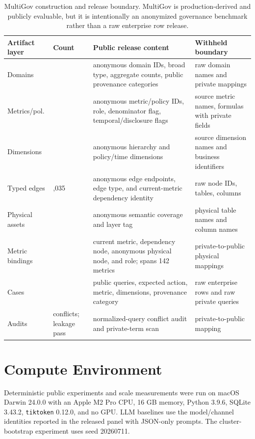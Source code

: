 \documentclass[letterpaper]{article}
\begin{document}
\begin{table}[t]
\centering
\scriptsize
\setlength{\tabcolsep}{4pt}
\begin{tabular}{@{}>{\raggedright\arraybackslash}p{}>{\raggedright\arraybackslash}p{}>{\raggedright\arraybackslash}p{}>{\raggedright\arraybackslash}p{}@{}}
\toprule
Artifact layer & Count & Public release content & Withheld boundary \\
\midrule
Domains & 12 & anonymous domain IDs, broad type, aggregate counts, public provenance categories & raw domain names and private mappings \\
Metrics/pol. & 170 & anonymous metric/policy IDs, role, denominator flag, temporal/disclosure flags & source metric names, formulas with private fields \\
Dimensions & 48 & anonymous hierarchy and policy/time dimensions & source dimension names and business identifiers \\
Typed edges & 1,035 & anonymous edge endpoints, edge type, and current-metric dependency identity & raw node IDs, tables, columns \\
Physical assets & 189 & anonymous semantic coverage and layer tag & physical table names and column names \\
Metric bindings & 178 & current metric, dependency node, anonymous physical node, and role; spans 142 metrics & private-to-public physical mappings \\
Cases & 510 & public queries, expected action, metric, dimensions, provenance category & raw enterprise rows and raw private queries \\
Audits & 0 conflicts; leakage pass & normalized-query conflict audit and private-term scan & private-to-public mapping \\
\bottomrule
\end{tabular}
\caption{MultiGov construction and release boundary. MultiGov is production-derived and publicly evaluable, but it is intentionally an anonymized governance benchmark rather than a raw enterprise row release.}
\end{table}

\section{Compute Environment}

Deterministic public experiments and scale measurements were run on macOS Darwin 24.0.0 with an Apple M2 Pro CPU, 16 GB memory, Python 3.9.6, SQLite 3.43.2, \texttt{tiktoken} 0.12.0, and no GPU. LLM baselines use the model/channel identities reported in the released panel with JSON-only prompts. The cluster-bootstrap experiment uses seed 20260711.
\end{document}

